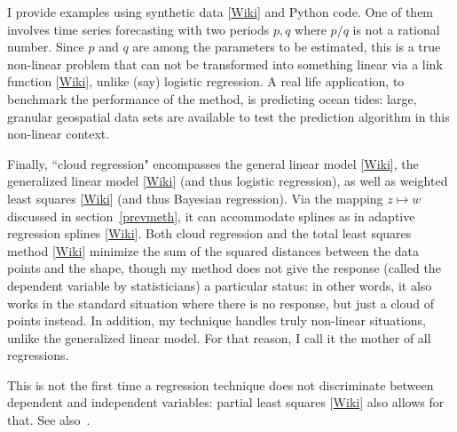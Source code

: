 \documentclass[oneside,10pt]{book}
\begin{document}
I provide examples using \textcolor{index}{synthetic data} [\href{https://en.wikipedia.org/wiki/Synthetic_data}{Wiki}] and Python code. One of them involves time series forecasting with two periods $p,q$ where $p/q$ is not a rational number. Since $p$ and $q$ are among the parameters to be estimated, this is a true non-linear problem that can not be transformed into something linear via a \textcolor{index}{link function} [\href{https://en.wikipedia.org/wiki/Generalized_linear_model#Link_function}{Wiki}], unlike (say) logistic regression.
A real life application, to benchmark the performance of the method, is predicting ocean tides: large, granular geospatial data sets are available to test
 the prediction algorithm in this non-linear context.


Finally, ``cloud regression" encompasses the \textcolor{index}{general linear model} [\href{https://en.wikipedia.org/wiki/General_linear_model}{Wiki}],
the \textcolor{index}{generalized linear model} [\href{https://en.wikipedia.org/wiki/Generalized_linear_model}{Wiki}] (and thus logistic regression),
 as well as \textcolor{index}{weighted least squares} [\href{https://en.wikipedia.org/wiki/Generalized_least_squares#Weighted_least_squares}{Wiki}]
 (and thus Bayesian regression). Via the mapping $z\mapsto w$ discussed in section~\ref{prevmeth}, it can accommodate splines as in
\textcolor{index}{adaptive regression splines} [\href{https://en.wikipedia.org/wiki/Multivariate_adaptive_regression_spline}{Wiki}].
 Both cloud regression and the \textcolor{index}{total least squares} method [\href{https://en.wikipedia.org/wiki/Total_least_squares}{Wiki}]  minimize the sum of the squared distances between the data points and the shape, though my method does not give the  response (called
 the dependent variable by statisticians) a particular status: in other words, it also works in the standard situation where there is no response, but just a cloud of points instead.
 In addition, my technique handles truly non-linear situations, unlike the generalized linear model. For that reason, I call it the mother of all regressions.

This is not the first time a regression technique does not discriminate between dependent and independent variables: \textcolor{index}{partial least squares} [\href{https://en.wikipedia.org/wiki/Partial_least_squares_regression}{Wiki}]
  also allows for that.  See also~\cite{fit2015}.
\end{document}
